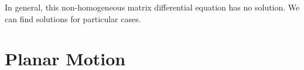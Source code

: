 \documentclass{article}
\begin{document}
In general, this non-homogeneous matrix differential equation has no solution. We can find solutions for particular cases.





%
%
%




\section{Planar Motion}
\end{document}
